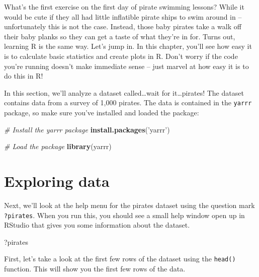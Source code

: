 \documentclass[]{book}
\newenvironment{Shaded}{\begin{snugshade}}{\end{snugshade}}
\newcommand{\KeywordTok}[1]{\textcolor[rgb]{0.13,0.29,0.53}{\textbf{{#1}}}}
\newcommand{\StringTok}[1]{\textcolor[rgb]{0.31,0.60,0.02}{{#1}}}
\newcommand{\CommentTok}[1]{\textcolor[rgb]{0.56,0.35,0.01}{\textit{{#1}}}}
\newcommand{\NormalTok}[1]{{#1}}
\theoremstyle{definition}
\theoremstyle{definition}
\theoremstyle{remark}
\begin{document}
What's the first exercise on the first day of pirate swimming lessons?
While it would be cute if they all had little inflatible pirate ships to
swim around in -- unfortunately this is not the case. Instead, those
baby pirates take a walk off their baby planks so they can get a taste
of what they're in for. Turns out, learning R is the same way. Let's
jump in. In this chapter, you'll see how easy it is to calculate basic
statistics and create plots in R. Don't worry if the code you're running
doesn't make immediate sense -- just marvel at how easy it is to do this
in R!

In this section, we'll analyze a dataset called\ldots{}wait for
it\ldots{}pirates! The dataset contains data from a survey of 1,000
pirates. The data is contained in the \texttt{yarrr} package, so make
sure you've installed and loaded the package:

\begin{Shaded}
\begin{Highlighting}[]
\CommentTok{# Install the yarrr package}
\KeywordTok{install.packages}\NormalTok{(}\StringTok{'yarrr'}\NormalTok{)}

\CommentTok{# Load the package}
\KeywordTok{library}\NormalTok{(yarrr)}
\end{Highlighting}
\end{Shaded}

\section{Exploring data}\label{exploring-data}

Next, we'll look at the help menu for the pirates dataset using the
question mark \texttt{?pirates}. When you run this, you should see a
small help window open up in RStudio that gives you some information
about the dataset.

\begin{Shaded}
\begin{Highlighting}[]
\NormalTok{?pirates}
\end{Highlighting}
\end{Shaded}

First, let's take a look at the first few rows of the dataset using the
\texttt{head()} function. This will show you the first few rows of the
data.
\end{document}

